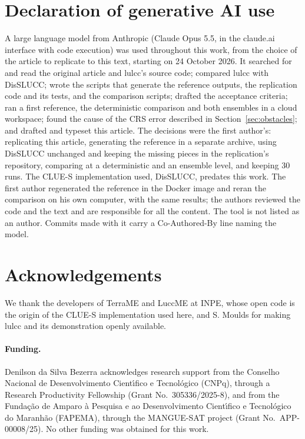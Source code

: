 \section*{Declaration of generative AI use}

A large language model from Anthropic (Claude Opus 5.5, in the claude.ai interface with
code execution) was used throughout this work, from the choice of the article to
replicate to this text, starting on 24 October 2026. It searched for and read the
original article and lulcc's source code; compared lulcc with DisSLUCC; wrote the
scripts that generate the reference outputs, the replication code and its tests, and
the comparison scripts; drafted the acceptance criteria; ran a first reference, the
deterministic comparison and both ensembles in a cloud workspace; found the cause of
the CRS error described in Section~\ref{sec:obstacles}; and drafted and typeset this
article. The decisions were the first author's: replicating this article, generating the
reference in a separate archive, using DisSLUCC unchanged and keeping the missing
pieces in the replication's repository, comparing at a deterministic and an ensemble
level, and keeping 30 runs. The CLUE-S implementation used, DisSLUCC, predates this
work. The first author regenerated the reference in the Docker image and reran the
comparison on his own computer, with the same results; the authors reviewed the code and
the text and are responsible for all the content. The tool is not listed as an author.
Commits made with it carry a Co-Authored-By line naming the model.

\section*{Acknowledgements}

We thank the developers of TerraME and LuccME at INPE, whose open code is the origin of
the CLUE-S implementation used here, and S. Moulds for making lulcc and its
demonstration openly available.

\paragraph{Funding.} Denilson da Silva Bezerra acknowledges research support from the
Conselho Nacional de Desenvolvimento Cient\'{\i}fico e Tecnol\'ogico (CNPq), through a
Research Productivity Fellowship (Grant No.\ 305336/2025-8), and from the Funda\c{c}\~ao de
Amparo \`a Pesquisa e ao Desenvolvimento Cient\'{\i}fico e Tecnol\'ogico do Maranh\~ao
(FAPEMA), through the MANGUE-SAT project (Grant No.\ APP-00008/25). No other funding was
obtained for this work.

